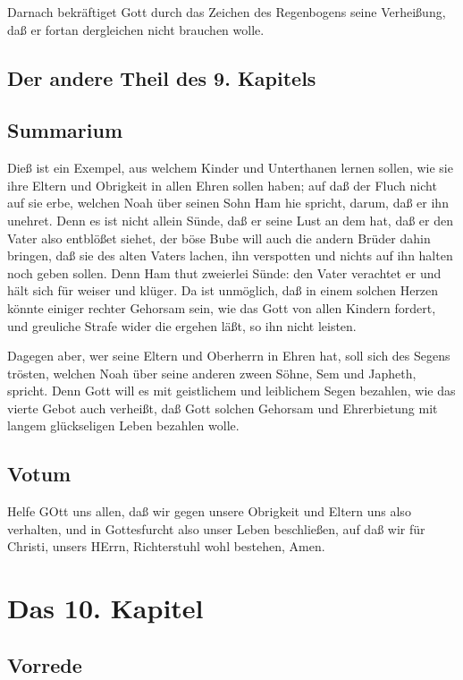 Darnach bekräftiget Gott durch das Zeichen des Regenbogens seine Verheißung, daß er fortan dergleichen nicht brauchen wolle.

\section{Der andere Theil des 9. Kapitels}

\section{Summarium}

Dieß ist ein Exempel, aus welchem Kinder und Unterthanen lernen sollen, wie sie ihre Eltern und Obrigkeit in allen Ehren sollen haben; auf daß der Fluch nicht auf sie erbe, welchen Noah über seinen Sohn Ham hie spricht, darum, daß er ihn unehret. Denn es ist nicht allein Sünde, daß er seine Lust an dem hat, daß er den Vater also entblößet siehet, der böse Bube will auch die andern Brüder dahin bringen, daß sie des alten Vaters lachen, ihn verspotten und nichts auf ihn halten noch geben sollen. Denn Ham thut zweierlei Sünde: den Vater verachtet er und hält sich für weiser und klüger. Da ist unmöglich, daß in einem solchen Herzen könnte einiger rechter Gehorsam sein, wie das Gott von allen Kindern fordert, und greuliche Strafe wider die ergehen läßt, so ihn nicht leisten.

Dagegen aber, wer seine Eltern und Oberherrn in Ehren hat, soll sich des Segens trösten, welchen Noah über seine anderen zween Söhne, Sem und Japheth, spricht. Denn Gott will es mit geistlichem und leiblichem Segen bezahlen, wie das vierte Gebot auch verheißt, daß Gott solchen Gehorsam und Ehrerbietung mit langem glückseligen Leben bezahlen wolle.

\section{Votum}

Helfe GOtt uns allen, daß wir gegen unsere Obrigkeit und Eltern uns also verhalten, und in Gottesfurcht also unser Leben beschließen, auf daß wir für Christi, unsers HErrn, Richterstuhl wohl bestehen, Amen.

\chapter{Das 10. Kapitel}

\section{Vorrede}

